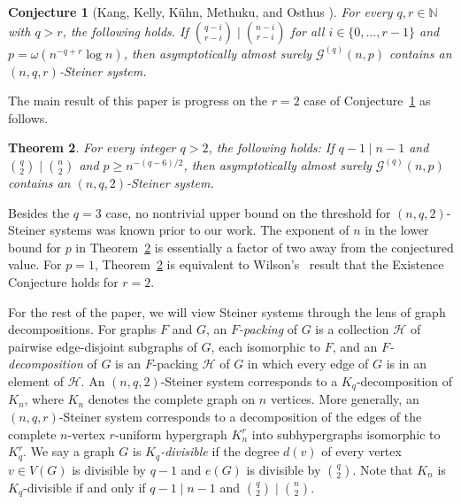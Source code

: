 \documentclass[11pt]{article}
\numberwithin{equation}{section}
\newcounter{i}
\theoremstyle{plain}
\newtheorem{thm}{Theorem}[section]
\newtheorem{conj}[thm]{Conjecture}
\theoremstyle{plain} %
\theoremstyle{definition}
\newcommand{\cH}{\mathcal{H}}
\newcommand{\cG}{\mathcal{G}}
\begin{document}
\begin{conj}[Kang, Kelly, K\"uhn, Methuku, and Osthus \cite{KKKMO22}]\label{conj:KKKMO} For every $q,r\in  \mathbb{N}$ with $q>r$, the following holds. 
If $\binom{q - i}{r - i} \mid \binom{n - i}{r - i}$ for all $i \in \{0, \dots, r-1\}$ and $p = \omega(n^{-q+r}\log n)$, then
asymptotically almost surely $\cG^{(q)}(n, p)$ contains an $(n,q,r)$-Steiner system.
\end{conj}

The main result of this paper is progress on the $r=2$ case of Conjecture~\ref{conj:KKKMO} as follows.

\begin{thm}\label{thm:ExistenceSpread} For every integer $q > 2$, the following holds:  
If $q - 1 \mid n - 1$ and $\binom{q}{2}\mid \binom{n}{2}$ and $p\geq n^{-(q-6)/2}$, then asymptotically almost surely $\cG^{(q)}(n,p)$ contains an $(n, q, 2)$-Steiner system.
\end{thm}

Besides the $q = 3$ case, no nontrivial upper bound on the threshold for $(n,q,2)$-Steiner systems was known prior to our work.  
The exponent of $n$ in the lower bound for $p$ in Theorem~\ref{thm:ExistenceSpread} is essentially a factor of two away from the conjectured value.
For $p = 1$, Theorem~\ref{thm:ExistenceSpread} is equivalent to Wilson's~\cite{WiI, WiII, WiIII} result that the Existence Conjecture holds for $r = 2$.  


For the rest of the paper, we will view Steiner systems through the lens of graph decompositions.  
For graphs $F$ and $G$, an \textit{$F$-packing} of $G$ is a collection $\cH$ of pairwise edge-disjoint subgraphs of $G$, each isomorphic to $F$, and an \textit{$F$-decomposition} of $G$ is an $F$-packing $\cH$ of $G$ in which every edge of $G$ is in an element of $\cH$.  
An $(n,q,2)$-Steiner system corresponds to a $K_q$-decomposition of $K_n$, where $K_n$ denotes the complete graph on $n$ vertices.  More generally, an $(n,q,r)$-Steiner system corresponds to a decomposition of the edges of the complete $n$-vertex $r$-uniform hypergraph $K^r_n$ into subhypergraphs isomorphic to $K^r_q$.  
We say a graph $G$ is \textit{$K_q$-divisible} if the degree $d(v)$ of every vertex $v\in V(G)$ is divisible by $q - 1$ and $e(G)$ is divisible by $\binom{q}{2}$.  Note that $K_n$ is $K_q$-divisible if and only if $q - 1 \mid n - 1$ and $\binom{q}{2} \mid \binom{n}{2}$.
\end{document}
